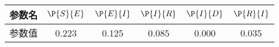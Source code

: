 \begin{tabular}{cccccc}
\hline
参数名&$\P{S}{E}$&$\P{E}{I}$&$\P{I}{R}$&$\P{I}{D}$&$\P{R}{I}$\\
\hline
参数值&0.223&0.125&0.085&0.000&0.035\\
\hline
\end{tabular}
